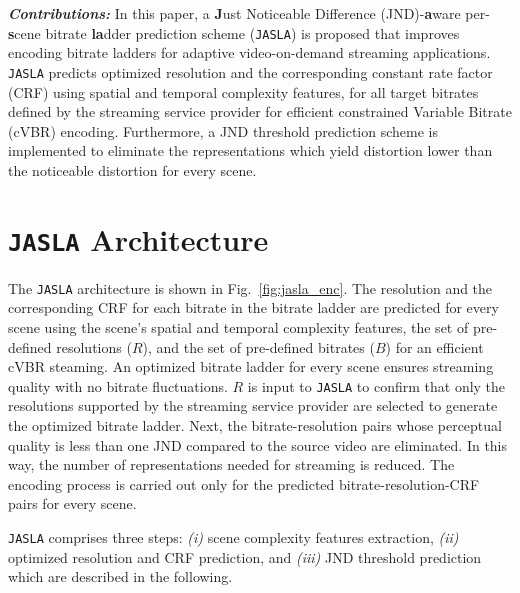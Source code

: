 \documentclass{article}
\newcommand{\opse}{\texttt{OPSE}\xspace}
\newcommand{\jaslad}{\texttt{JASLA}\xspace}
\begin{document}
\textbf{\textit{Contributions:}} In this paper, a \textbf{J}ust Noticeable Difference (JND)-\textbf{a}ware per-\textbf{s}cene bitrate \textbf{la}dder prediction scheme (\jaslad) is proposed that improves encoding bitrate ladders for adaptive video-on-demand streaming applications. \jaslad predicts optimized resolution and the corresponding constant rate factor (CRF) using spatial and temporal complexity features, for all target bitrates defined by the streaming service provider for efficient constrained Variable Bitrate (cVBR) encoding. Furthermore, a JND threshold prediction scheme is implemented to eliminate the representations which yield distortion lower than the noticeable distortion for every scene. 
\vspace{-0.7em}
\section{\jaslad Architecture}
\label{sec:ppte_framework}
\vspace{-0.6em}
The \jaslad architecture is shown in Fig.~\ref{fig:jasla_enc}. The resolution and the corresponding CRF for each bitrate in the bitrate ladder are predicted for every scene using the scene's spatial and temporal complexity features, the set of pre-defined resolutions ($R$), and the set of pre-defined bitrates ($B$) for an efficient cVBR steaming. An optimized bitrate ladder for every scene ensures streaming quality with no bitrate fluctuations. $R$ is input to \jaslad to confirm that only the resolutions supported by the streaming service provider are selected to generate the optimized bitrate ladder. Next, the bitrate-resolution pairs whose perceptual quality is less than one JND compared to the source video are eliminated. In this way, the number of representations needed for streaming is reduced. The encoding process is carried out only for the predicted bitrate-resolution-CRF pairs for every scene. 

\jaslad comprises three steps: \textit{(i)} scene complexity features extraction, \textit{(ii)} optimized resolution and CRF prediction, and \textit{(iii)} JND threshold prediction which are described in the following.
\vspace{-0.6em}
\end{document}
